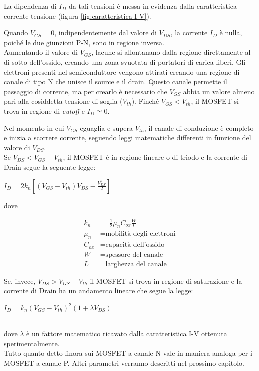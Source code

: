 La dipendenza di $I_D$ da tali tensioni è messa in evidenza dalla caratteristica corrente-tensione (figura \ref{fig:caratteristica-I-V}).

Quando $V_{GS} = 0$, indipendentemente dal valore di $V_{DS}$, la corrente $I_D$ è nulla, poiché le due giunzioni P-N, sono in regione inversa. \\
Aumentando il valore di $V_{GS}$, lacune si allontanano dalla regione direttamente al di sotto dell'ossido, creando una
zona svuotata di portatori di carica liberi. Gli elettroni presenti nel semiconduttore
vengono attirati creando una regione di canale di tipo N che unisce il
source e il drain. Questo canale permette il passaggio di corrente, ma per crearlo è necessario che $V_{GS}$ abbia un valore almeno pari alla cosiddetta tensione di soglia ($V_{th}$). Finché $V_{GS} < V_{th}$, il MOSFET si trova in regione di \emph{cutoff} e $I_D \simeq 0$.

Nel momento in cui $V_{GS}$ eguaglia e supera $V_{th}$, il canale di conduzione è completo e inizia a scorrere corrente, seguendo leggi matematiche differenti in funzione del valore di $V_{DS}$.\\

Se $V_{DS} < V_{GS} -  V_{th}$, il MOSFET è in regione lineare o di triodo e la corrente di Drain segue la seguente legge:\\
\centerline{ $I_D = 2k_n\left[ \left(V_{GS}-V_{th}\right)V_{DS} - \frac{V_{DS}^2}{2}\right]$}

dove

\begin{align*}
   k_n &= \frac{1}{2}\mu_n C_{ox}\frac{W}{L} \\
   \mu_n &= \text{mobilità degli elettroni} \\
   C_{ox} &= \text{capacità dell'ossido} \\
   W &= \text{spessore del canale} \\
   L &= \text{larghezza del canale}
\end{align*}

Se, invece, $V_{DS} > V_{GS} -  V_{th}$ il MOSFET si trova in regione di saturazione e la corrente di Drain ha un andamento lineare che segue la legge:\\
\centerline{ $I_D = k_n\left(V_{GS}-V_{th}\right)^2 (1+\lambda V_{DS})$}\\
dove $\lambda$ è un fattore matematico ricavato dalla caratteristica I-V ottenuta sperimentalmente.\\

Tutto quanto detto finora sui MOSFET a canale N vale in maniera analoga per i MOSFET a canale P.
Altri parametri verranno descritti nel prossimo capitolo.

